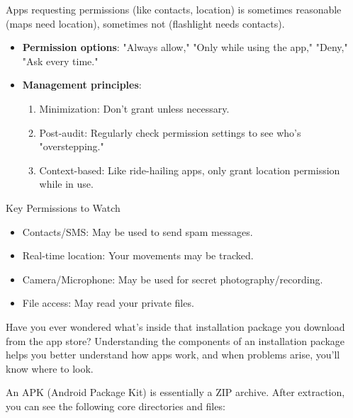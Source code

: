 
Apps requesting permissions (like contacts, location) is sometimes reasonable (maps need location), sometimes not (flashlight needs contacts).

\begin{itemize}
  \item \textbf{Permission options}: "Always allow," "Only while using the app," "Deny," "Ask every time."
  \item \textbf{Management principles}:
  \begin{enumerate}
    \item Minimization: Don't grant unless necessary.
    \item Post-audit: Regularly check permission settings to see who's "overstepping."
    \item Context-based: Like ride-hailing apps, only grant location permission while in use.
  \end{enumerate}
\end{itemize}

\begin{tcbwarn}{Key Permissions to Watch}
\begin{itemize}
  \item Contacts/SMS: May be used to send spam messages.
  \item Real-time location: Your movements may be tracked.
  \item Camera/Microphone: May be used for secret photography/recording.
  \item File access: May read your private files.
\end{itemize}

\end{tcbwarn}


Have you ever wondered what's inside that installation package you download from the app store? Understanding the components of an installation package helps you better understand how apps work, and when problems arise, you'll know where to look.


An APK (Android Package Kit) is essentially a ZIP archive. After extraction, you can see the following core directories and files:

